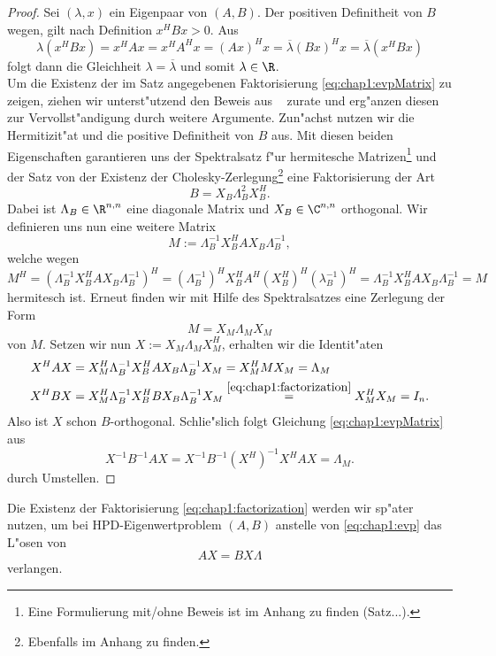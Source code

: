 \begin{proof}
Sei $(\lambda,x)$ ein Eigenpaar von $(A,B)$. Der positiven Definitheit von $B$ wegen, gilt nach Definition $x^H B x > 0$. Aus
\[
\lambda (x^H B x) = x^H Ax = x^H A^H x = (Ax)^H x
= \overline{\lambda} (Bx)^H x = \overline{\lambda} (x^H B x)
\]
folgt dann die Gleichheit $\lambda = \overline{\lambda}$ und somit $\lambda\in\R$.\\

 Um die Existenz der im Satz angegebenen Faktorisierung \eqref{eq:chap1:evpMatrix}
zu zeigen, ziehen wir unterst"utzend den Beweis aus ~\cite[Theorem 15.3.2, 344 f.]{parlett} zurate und erg"anzen diesen zur Vervollst"andigung durch weitere Argumente.
Zun"achst nutzen wir die Hermitizit"at und die positive Definitheit von $B$ aus. Mit diesen beiden Eigenschaften garantieren uns der Spektralsatz f"ur hermitesche Matrizen\footnote{Eine Formulierung mit/ohne Beweis ist im Anhang zu finden (Satz...).}
und der Satz von der Existenz der Cholesky-Zerlegung\footnote{Ebenfalls im Anhang zu finden.} eine Faktorisierung der Art
\begin{equation}\label{eq:chap1:factorization}
B = X_B \Lambda_B^2 X_B^H.
\end{equation}
Dabei ist $\Lambda_B\in\R^{n,n}$ eine diagonale Matrix und $X_B \in \C^{n,n}$ orthogonal.
Wir definieren uns nun eine weitere Matrix
\[
M:= \Lambda_B^{-1} X_B^H A X_B \Lambda_B^{-1},
\]
welche wegen
\[
M^H = \left(\Lambda_B^{-1} X_B^H A X_B \Lambda_B^{-1}\right)^H
= (\Lambda_B^{-1})^{H} X_B^H A^H (X_B^H)^H (\lambda_B^{-1})^H
= \Lambda_B^{-1} X_B^H A X_B \Lambda_B^{-1}
= M
\]
hermitesch ist. Erneut finden wir mit Hilfe des Spektralsatzes eine Zerlegung der Form
\[
M = X_M \Lambda_M X_M
\]
von $M$. Setzen wir nun $X:=X_M \Lambda_M X_M^H$, erhalten wir die Identit"aten
\begin{align*}
X^H A X &= X_M^H \Lambda_B^{-1} X_B^H A X_B \Lambda_B^{-1} X_M = X_M^H M X_M = \Lambda_M\\
X^H B X &= X_M^H \Lambda_B^{-1} X_B^H B X_B \Lambda_B^{-1} X_M \overset{\eqref{eq:chap1:factorization}}{=} X_M^H X_M = I_n.
\end{align*}
Also ist $X$ schon $B$-orthogonal. Schlie"slich folgt Gleichung \eqref{eq:chap1:evpMatrix} aus
\[
X^{-1}B^{-1}AX = X^{-1}B^{-1} (X^H)^{-1} X^H AX = \Lambda_M.
\]
durch Umstellen.
\end{proof}

Die Existenz der Faktorisierung \eqref{eq:chap1:factorization}
werden wir sp"ater nutzen, um bei HPD-Eigenwertproblem $(A,B)$ anstelle von \eqref{eq:chap1:evp} das L"osen von
\[
AX = BX\Lambda
\]
verlangen.






